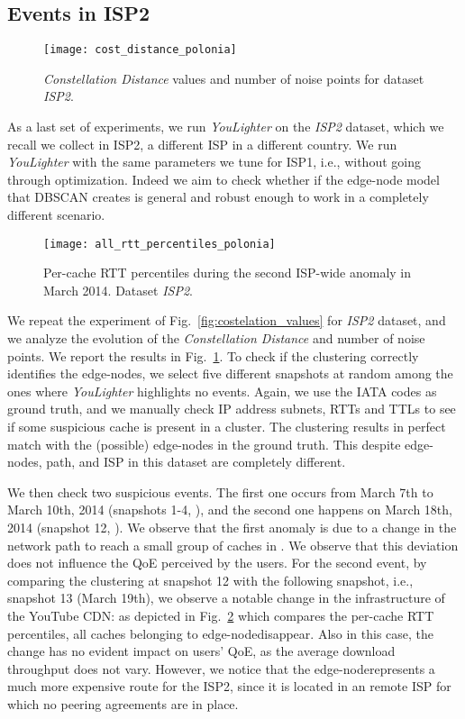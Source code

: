 \documentclass{acm_proc_article-sp}
\newcommand{\tool}{\textit{YouLighter}\xspace}
\newcommand{\distance}{\textit{Constellation Distance}\xspace}
\newcommand{\node}{{edge-node}\xspace}
\newcommand{\nodes}{{edge-nodes}\xspace}
\newcommand{\TC}{\textit{ISP2}\xspace}
\begin{document}
\subsection{Events in ISP2}

\begin{figure}[t!]
 \centering
 \texttt{[image: cost\_distance\_polonia]}
 \caption{\distance values and number of noise points for dataset \TC.}
\label{fig:costelation_polonia}
\end{figure}

As a last set of experiments, we run \tool on the \TC dataset, which we recall we collect in ISP2, a different ISP in a different country. We run \tool with the same parameters we tune for ISP1, i.e., without going through  optimization.
Indeed we aim to check whether if the \node model that DBSCAN creates is general and robust enough to work in a completely different scenario.

\begin{figure}[t!]
\centering
\texttt{[image: all\_rtt\_percentiles\_polonia]}
\caption{Per-cache RTT percentiles during the second ISP-wide anomaly in March 2014. Dataset \TC.}
    \label{fig:CD_poland}
\end{figure}

We repeat the experiment of Fig.~\ref{fig:costelation_values} for \TC dataset, and we analyze the evolution of the \distance and number of noise points. We report the results in Fig.~\ref{fig:costelation_polonia}.
To check if the clustering correctly identifies the \nodes, we select five different snapshots at random among the ones where \tool highlights no events. Again, we use the IATA codes as ground truth, and we manually check IP address subnets, RTTs and TTLs to see if some suspicious cache is present in a cluster. The clustering results in perfect match with the (possible) \nodes in the ground truth.
This despite \nodes, path, and ISP in this dataset are completely different.

We then check two suspicious events. The first one occurs from March 7th to March 10th, 2014 (snapshots 1-4, ), and the second one happens on March 18th, 2014 (snapshot 12, ). We observe that the first anomaly is due to a change in the network path to reach a small group of caches in \FRA. We observe that this deviation does not influence the QoE perceived by the users. For the second event, by comparing the clustering at snapshot 12 with the following snapshot, i.e., snapshot 13 (March 19th), we observe a notable change in the infrastructure of the YouTube CDN: as depicted in Fig.~\ref{fig:CD_poland} which compares the per-cache RTT percentiles, all caches belonging to \node \MAD disappear. Also in this case, the change has no evident impact on users' QoE, as the average download throughput does not vary. However, we notice that the \node \MAD represents a much more expensive route for the ISP2, since it is located in an remote ISP for which no peering agreements are in place.
\end{document}

